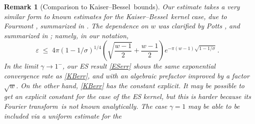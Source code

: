 \documentclass[10pt]{article}
\newcommand{\be}{\begin{equation}}
\newcommand{\ee}{\end{equation}}
\newcommand{\eps}{\varepsilon}
\newtheorem{rmk}[thm]{Remark}
\newcommand{\rat}{\sigma}          %
\newcommand{\KB}{Kaiser--Bessel}
\newcommand{\FT}{Fourier transform}
\begin{document}
\begin{rmk}[Comparison to \KB\ bounds]
  \label{fourmont}
  Our estimate takes a very similar form to known estimates
  for the \KB\ kernel case, due to Fourmont \cite[p.~30-38]{fourmontthesis},
  summarized in \cite[Sec.~4]{fourmont}.
  The dependence on $w$ was clarified by Potts \cite[p.~30-31]{pottshabil},
  and summarized in \cite[App.~C]{nfft}; namely, in our notation,
  \be
  \eps \;\le\; 4\pi   (1-1/\rat)^{1/4}
  \left(\sqrt{\frac{w-1}{2}}+\frac{w-1}{2}\right)
  e^{-\pi(w-1)\sqrt{1-1/\rat}}
  ~.
  \label{KBerr}
  \ee
  In the limit $\gamma\to1^{-}$, our ES result \eqref{ESerr}
  shows the same exponential convergence rate as \eqref{KBerr},
  and with an algebraic prefactor improved by a factor $\sqrt{w}$.
  On the other hand, \eqref{KBerr} has the constant explicit.
  It may be possible to get an explicit constant for the case of the ES kernel,
  but this is harder because its \FT\ is not known analytically.
  The case $\gamma=1$ may be able to be included via a uniform estimate for
  the 
\end{rmk}
\end{document}
